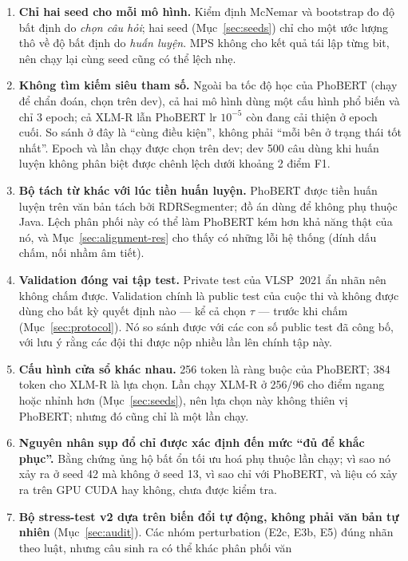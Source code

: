 \begin{enumerate}
  \item \textbf{Chỉ hai seed cho mỗi mô hình.} Kiểm định McNemar và bootstrap đo độ bất định do \emph{chọn
        câu hỏi}; hai seed (Mục~\ref{sec:seeds}) chỉ cho một ước lượng thô về độ bất định do \emph{huấn
        luyện}. MPS không cho kết quả tái lập từng bit, nên chạy lại cùng seed cũng có thể lệch nhẹ.
  \item \textbf{Không tìm kiếm siêu tham số.} Ngoài ba tốc độ học của PhoBERT (chạy để chẩn đoán, chọn
        trên dev), cả hai mô hình dùng một cấu hình phổ biến và chỉ 3 epoch; cả XLM-R lẫn PhoBERT
        lr $10^{-5}$ còn đang cải thiện ở epoch cuối. So sánh ở đây là ``cùng điều kiện'', không phải ``mỗi
        bên ở trạng thái tốt nhất''. Epoch và lần chạy được chọn trên dev; dev 500 câu dùng khi huấn luyện
        không phân biệt được chênh lệch dưới khoảng 2 điểm F1.
  \item \textbf{Bộ tách từ khác với lúc tiền huấn luyện.} PhoBERT được tiền huấn luyện trên văn bản tách
        bởi RDRSegmenter; đồ án dùng  để không phụ thuộc Java. Lệch phân phối này có thể làm
        PhoBERT kém hơn khả năng thật của nó, và Mục~\ref{sec:alignment-res} cho thấy  có những
        lỗi hệ thống (dính dấu chấm, nối nhầm âm tiết).
  \item \textbf{Validation đóng vai tập test.} Private test của VLSP~2021 ẩn nhãn nên không chấm được.
        Validation chính là public test của cuộc thi và không được dùng cho bất kỳ quyết định nào --- kể cả
        chọn $\tau$ --- trước khi chấm (Mục~\ref{sec:protocol}). Nó so sánh được với các con số public test đã
        công bố, với lưu ý rằng các đội thi được nộp nhiều lần lên chính tập này.
  \item \textbf{Cấu hình cửa sổ khác nhau.} 256 token là ràng buộc của PhoBERT; 384 token cho XLM-R là lựa
        chọn. Lần chạy XLM-R ở 256/96 cho điểm ngang hoặc nhỉnh hơn (Mục~\ref{sec:seeds}), nên lựa chọn này
        không thiên vị PhoBERT; nhưng đó cũng chỉ là một lần chạy.
  \item \textbf{Nguyên nhân sụp đổ chỉ được xác định đến mức ``đủ để khắc phục''.} Bằng chứng ủng hộ bất ổn
        tối ưu hoá phụ thuộc lần chạy; vì sao nó xảy ra ở seed 42 mà không ở seed 13, vì sao chỉ với PhoBERT,
        và liệu có xảy ra trên GPU CUDA hay không, chưa được kiểm tra.
  \item \textbf{Bộ stress-test v2 dựa trên biến đổi tự động, không phải văn bản tự nhiên} (Mục~\ref{sec:audit}).
        Các nhóm perturbation (E2c, E3b, E5) đúng nhãn theo luật, nhưng câu sinh ra có thể khác phân phối văn

\end{enumerate}
